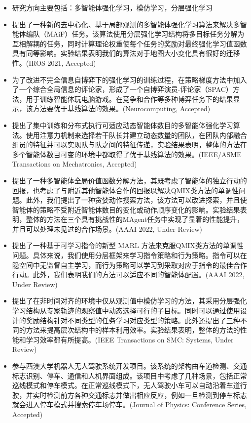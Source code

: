 
{\small
  \begin{itemize}
    \item 研究方向主要包括：多智能体强化学习，模仿学习，分层强化学习
    \item 提出了一种新的去中心化、基于局部观测的多智能体强化学习算法来解决多智能体编队（MAiF）任务。该算法使用分层强化学习结构将多目标任务分解为互相解耦的任务，同时计算理论权重使每个任务的奖励对最终强化学习值函数具有同等影响。实验结果表明我们的算法对于地图大小变化具有很好的迁移性。(IROS 2021, Accepted)
    \item 为了改进不完全信息自博弈下的强化学习的训练过程，在策略梯度方法中加入了一个综合全局信息的评论家，形成了一个自博弈演员-评论家（SPAC）方法，用于训练智能体玩电脑游戏。在竞争和合作等多种博弈任务下的结果显示，该方法要优于基线算法的效果。(Neurocomputing, Accepted)
    \item 提出了集中训练和分布式执行可适应动态智能体数目的多智能体强化学习算法。使用注意力机制来选择若干队长并建立动态数量的团队，在团队内部融合组员的特征并可以实现队与队之间的特征传递，实验结果表明，整体的方法在多个智能体数目可变的环境中都取得了优于基线算法的效果。(IEEE/ASME Transactions on Mechatronics, Accepted)
    \item 提出了一种多智能体全局价值函数分解方法，其既考虑了智能体的独立行动的回报，也考虑了与附近其他智能体合作的回报以解决QMIX类方法的单调性问题。此外，我们提出了一种贪婪动作搜索方法，该方法可以改进探索，并且使智能体的策略不受附近智能体数目的变化或动作顺序变化的影响。实验结果表明，整体的方法在三个具有挑战性的MAgent任务中实现了显着的性能提升，并且可以处理未见过的合作场景。(AAAI 2022, Under Review)
    \item 提出了一种基于可学习指令的新型 MARL 方法来克服QMIX类方法的单调性问题。具体来说，我们使用分层框架来学习指令策略和行为策略。指令可以在隐空间中无监督自主学习，而行为策略可以学习到采取对应于指令的最佳合作行动。此外，我们表明我们的方法可以适应不同的智能体配置。(AAAI 2022, Under Review)
    \item 提出了在非时间对齐的环境中仅从观测值中模仿学习的方法，其采用分层强化学习结构从专家轨迹的观察值中动态选择可行的子目标。同时可以通过使用设计的奖励结构针对不同类型的任务学习对应类型的策略。此外还提出了三种不同的方法来提高层次结构中的样本利用效率。实验结果表明，整体的方法的性能和学习效率都有所提高。(IEEE Transactions on SMC: Systems, Under Review)
  \end{itemize}
}

{\small
  \begin{itemize}
    \item 参与西澳大学机器人无人驾驶系统开发项目。该系统的架构由车道检测、交通标志识别、停车、通信和人机界面组成。该项目中考虑了几种场景，包括正常巡线模式和停车模式。在正常巡线模式下，无人驾驶小车可以自动沿着车道行驶，并实时检测前方各种交通标志并做出相应反应，例如一旦检测到停车标志就会进入停车模式并搜索停车场停车。(Journal of Physics: Conference Series, Accepted)
  \end{itemize}
}



